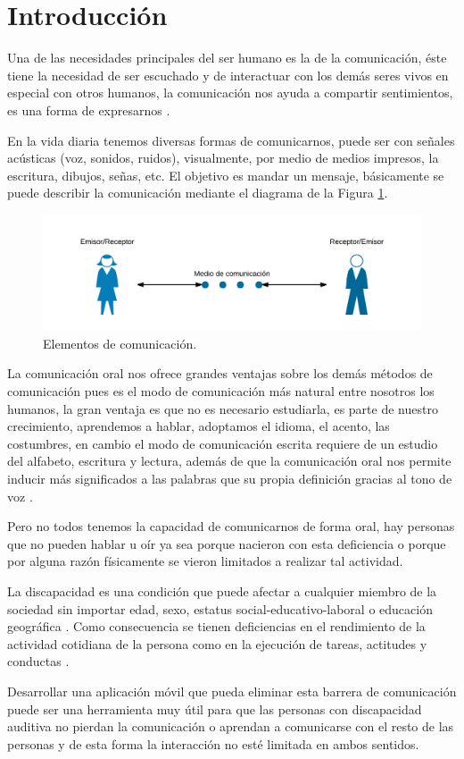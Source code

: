 \setcounter{page}{10}
\section{Introducción}

	Una de las necesidades principales del ser humano es la de la comunicación, éste tiene la necesidad de ser escuchado y de interactuar con los demás seres vivos en especial con otros humanos, la comunicación nos ayuda a compartir sentimientos, es una forma de expresarnos \cite{VelezMelendez2004}.

	En la vida diaria tenemos diversas formas de comunicarnos, puede ser con señales acústicas (voz, sonidos, ruidos), visualmente, por medio de medios impresos, la escritura, dibujos, señas, etc. El objetivo es mandar un mensaje, básicamente se puede describir la comunicación mediante el diagrama de la Figura \ref{comunicacion}.

	\begin{figure}[H]
		\centering
		\includegraphics[scale = 1]{figures/Comunicacion}
		\caption{Elementos de comunicación.}
		\label{comunicacion}
	\end{figure}

	La comunicación oral nos ofrece grandes ventajas sobre los demás métodos de comunicación pues es el modo de comunicación más natural entre nosotros los humanos, la gran ventaja es que no es necesario estudiarla, es parte de nuestro crecimiento, aprendemos a hablar, adoptamos el idioma, el acento, las costumbres, en cambio el modo de comunicación escrita requiere de un estudio del alfabeto, escritura y lectura, además de que la comunicación oral nos permite inducir más significados a las palabras que su propia definición gracias al tono de voz \cite{CamargoLopez}.

	Pero no todos tenemos la capacidad de comunicarnos de forma oral, hay personas que no pueden hablar u oír ya sea porque nacieron con esta deficiencia o porque por alguna razón físicamente se vieron limitados a realizar tal actividad.

	La discapacidad es una condición que puede afectar a cualquier miembro de la sociedad sin importar edad, sexo, estatus social-educativo-laboral o educación geográfica \cite{Flores}. Como consecuencia se tienen deficiencias en el rendimiento de la actividad cotidiana de la persona como en la ejecución de tareas, actitudes y conductas \cite{Flores}.

	Desarrollar una aplicación móvil que pueda eliminar esta barrera de comunicación puede ser una herramienta muy útil para que las personas con discapacidad auditiva no pierdan la comunicación o aprendan a comunicarse con el resto de las personas y de esta forma la interacción no esté limitada en ambos sentidos.